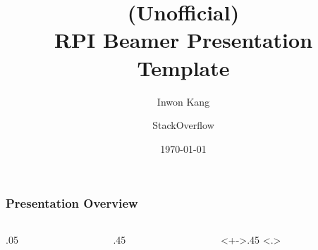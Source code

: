 \documentclass[
	10pt, %
	aspectratio=169, %
]{beamer}
\title{(Unofficial)\\RPI Beamer Presentation Template}
\author[]{Inwon Kang \and StackOverflow} %
\institute[RPI]{Department of Computer Science}
\date[\today]{\today}
\begin{document}
\begin{frame}[plain]
	\titlepage %
\end{frame}



\begin{frame}[noframenumbering]
	\frametitle{Presentation Overview} %
	\begin{columns}[t]
		\begin{column}{.05\textwidth}
		\end{column}
		\begin{column}{.45\textwidth}
			\tableofcontents[
				pausesections,
				sections={-3}
			]
		\end{column}
		\begin{column}<+->{.45\textwidth}
			\only<.>{\setcounter{tocseccounter}{\slideinframe}}
			\advanceslidecounter{-\thetocseccounter}
			\tableofcontents[
				pausesections,
				sections={4-}
			]
		\end{column}
	\end{columns}

\end{frame}

\end{document}
